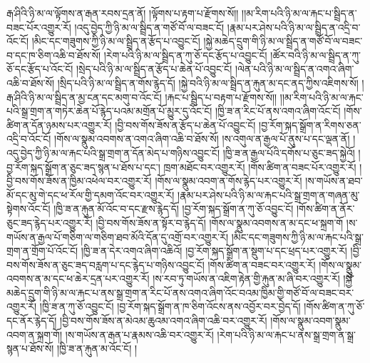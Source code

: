 རྒ་ཤིའི་ཉི་མ་ལ་ལྟོགས་ན་རྒན་རབས་དྲན་ནོ། །ལྟོགས་པ་རྟག་པ་རྫོགས་སོ།། །།མ་རིག་པའི་ཉི་མ་ལ་རྐང་པ་སྦྲིད་ན་བཟང་པོར་འགྱུར་རོ། །འདུ་བྱེད་ཀྱི་ཉི་མ་ལ་སྦྲིད་ན་གཙོ་བོ་ལ་བཟང་ངོ། །རྣམ་པར་ཤེས་པའི་ཉི་མ་ལ་སྦྲིད་ན་འདྲི་བ་འོང་ངོ། །མིང་དང་གཟུགས་ཀྱི་ཉི་མ་ལ་སྦྲིད་ན་རྩོད་པ་འབྱུང་ངོ། །སྐྱེ་མཆེད་དྲུག་གི་ཉི་མ་ལ་སྦྲིད་ན་གཙོ་བོ་ལ་བཟང་བ་དང་ཁ་ཅིག་འཆི་བ་ཐོས་སོ། །རེག་པའི་ཉི་མ་ལ་སྦྲིད་ན་ཀུ་ཅོ་དང་རྩོད་པ་འབྱུང་ངོ། །ཚོར་བའི་ཉི་མ་ལ་སྦྲིད་ན་ཀུ་ཅོ་དང་རྩོད་པ་འོང་ངོ། །སྲེད་པའི་ཉི་མ་ལ་སྦྲིད་ན་རྩོད་པ་ཆེན་པོ་འབྱུང་ངོ། །ལེན་པའི་ཉི་མ་ལ་སྦྲིད་ན་འགའ་ཞིག་འཆི་བ་ཐོས་སོ། །སྲིད་པའི་ཉི་མ་ལ་སྦྲིད་ན་གོས་རྙེད་དོ། །སྐྱེ་བའི་ཉི་མ་ལ་སྦྲིད་ན་རྐུན་མ་དང་ནད་ཀྱིས་འཇིགས་སོ། །རྒ་ཤིའི་ཉི་མ་ལ་སྦྲིད་ན་མྱ་ངན་དང་མགུ་བ་འོང་ངོ། །རྐང་པ་སྦྲིད་པ་བརྟག་པ་རྫོགས་སོ།། །།མ་རིག་པའི་ཉི་མ་ལ་རྐང་པའི་སྒྲ་གྲག་ན་གཏེར་ཆེན་པོ་རྙེད་པའམ་མགྲོན་པོ་མྱུར་དུ་འོང་ངོ། །ཁྱི་ཟ་ན་རིང་པོ་ནས་འགའ་ཞིག་འོང་ངོ། །གོས་ཚིག་ན་དོན་ཉམས་པར་འགྱུར་རོ། །བྱི་བས་གོས་ཟོས་ན་རྩོད་པ་ཆེན་པོ་འབྱུང་ངོ། །བྱ་རོག་སྐད་སྒྲོག་ན་རིགས་ཅན་འདྲི་བ་འོང་ངོ། །གོས་ལ་སྣུམ་འབགས་ན་འགའ་ཞིག་འཆི་བ་ཐོས་སོ། །ས་འགུལ་ན་རྒྱལ་པོ་ནུས་པ་དང་ལྡན་ནོ། །འདུ་བྱེད་ཀྱི་ཉི་མ་ལ་རྐང་པའི་སྒྲ་གྲག་ན་དོན་མེད་པ་གཉིས་འབྱུང་ངོ། །ཁྱི་ཟ་ན་རྒྱལ་པོའི་དགོས་པ་ཅུང་ཟད་སྐྱེའོ། །བྱ་རོག་སྐད་སྒྲོག་ན་ཅུང་ཟད་སྙན་པ་ཐོས་པ་དང་། ཁྲག་མཐོང་བར་འགྱུར་རོ། །གོས་ཚིག་ན་བཟང་པོར་འགྱུར་རོ། །བྱི་བས་གོས་ཟོས་ན་ཁྱིམ་འཕེལ་བར་འགྱུར་རོ། །གོས་ལ་སྣུམ་འབག་ན་གོས་རྙེད་པར་འགྱུར་རོ། །ས་གཡོས་ན་ཐབ་མོ་དང་མུ་གེ་དང་ཕ་རོལ་གྱི་དམག་འོང་བར་འགྱུར་རོ། །རྣམ་པར་ཤེས་པའི་ཉི་མ་ལ་རྐང་པའི་སྒྲ་གྲག་ན་གཞན་མུ་སྟེགས་འོང་ངོ། །ཁྱི་ཟ་ན་རྐུན་མོ་འོང་བ་དང་རྫས་རྙེད་དོ། །བྱ་རོག་སྐད་སྒྲོག་ན་ཀུ་ཅོ་འབྱུང་ངོ། །གོས་ཚིག་ན་ནོར་ཅུང་ཟད་རྙེད་པར་འགྱུར་རོ། །བྱི་བས་གོས་ཟོས་ན་སྟོར་བ་རྙེད་དོ། །གོས་ལ་སྣུམ་འབགས་ན་མ་དང་ཕ་སྐྲག་གོ །ས་གཡོས་ན་རྒྱལ་པོ་གཅིག་ལ་གཅིག་ཐབ་མོའི་དོན་དུ་འགྲོ་བར་འགྱུར་རོ། །མིང་དང་གཟུགས་ཀྱི་ཉི་མ་ལ་རྐང་པའི་སྒྲ་གྲག་ན་གྲོག་པོ་འོང་ངོ། །ཁྱི་ཟ་ན་དེར་འགའ་ཞིག་འཆིའོ། །བྱ་རོག་སྐད་སྒྲོག་ན་སྡུག་པ་དང་ཕྲད་པར་འགྱུར་རོ། །བྱི་བས་གོས་ཟོས་ན་ཅུང་ཟད་བརླག་པ་དང་རྙེད་པ་གཉིས་འབྱུང་ངོ། །གོས་ཚིག་ན་བཟང་བར་འགྱུར་རོ། །གོས་ལ་སྣུུམ་འབགས་ན་མ་དང་ཕ་ཆེར་དྲན་པར་འགྱུར་རོ། །ས་རབ་ཏུ་གཡོས་ན་འཇིག་རྟེན་གྱི་རྐུན་མ་ཞི་བར་འགྱུར་རོ། །སྐྱེ་མཆེད་དྲུག་གི་ཉི་མ་ལ་རྐང་པ་ནས་སྒྲ་གྲག་ན་རིང་པོ་ནས་འགའ་ཞིག་འོང་བའམ་ཁྱིམ་གྱི་གཙོ་བོ་ལ་བཟང་བར་འགྱུར་རོ། །ཁྱི་ཟ་ན་ཀུ་ཅོ་འབྱུང་ངོ། །བྱ་རོག་སྐད་སྒྲོག་ན་ཁ་ཅིག་འོངས་ནས་འབྱོར་བར་བྱེད་དོ། །གོས་ཚིག་ན་ཀུ་ཅོ་དང་ནོར་རྙེད་དོ། །བྱི་བས་གོས་ཟོས་ན་མེའམ་ཆུའམ་འགའ་ཞིག་འཆི་བར་འགྱུར་རོ། །གོས་ལ་སྣུམ་འབག་སྣུམ་འབག་ན་སྐྲག་གོ། །ས་གཡོས་ན་རྒན་པ་རྣམས་འཆི་བར་འགྱུར་རོ། །རེག་པའི་ཉི་མ་ལ་རྐང་པ་ནས་སྒྲ་གྲག་ན་སྒྲ་སྙན་པ་ཐོས་སོ། །ཁྱི་ཟ་ན་རྐུན་མ་འོང་ངོ། །
